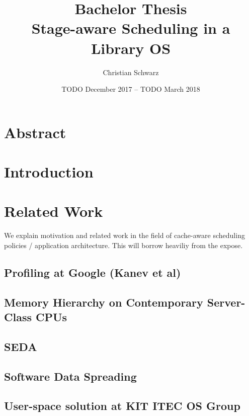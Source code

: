 \documentclass[12pt,a4paper]{article}
\title{{\large Bachelor Thesis}\\Stage-aware Scheduling in a Library OS}
\author{Christian Schwarz}
\date{TODO December 2017 -- TODO March 2018}
\begin{document}
\maketitle

\clearpage

\section{Abstract}

\clearpage

\tableofcontents

\clearpage

\section{Introduction}

\section{Related Work}
We explain motivation and related work in the field of cache-aware scheduling policies / application architecture.
This will borrow heaviliy from the expose.

\subsection{Profiling at Google (Kanev et al)}
\subsection{Memory Hierarchy on Contemporary Server-Class CPUs}
\subsection{SEDA}
\subsection{Software Data Spreading}
\subsection{User-space solution at KIT ITEC OS Group}
\end{document}
